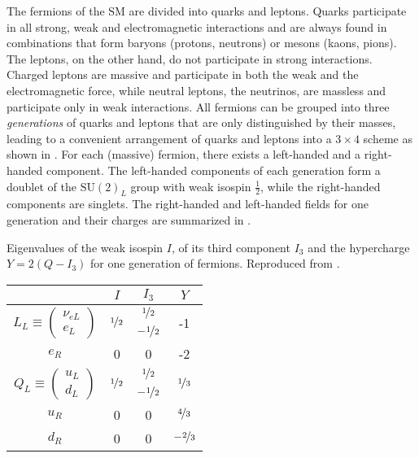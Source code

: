 The fermions of the SM are divided into quarks and leptons. Quarks participate in all strong, weak and electromagnetic interactions and are always found in combinations that form baryons (protons, neutrons) or mesons (kaons, pions). The leptons, on the other hand, do not participate in strong interactions. Charged leptons are massive and participate in both the weak and the electromagnetic force, while neutral leptons, the neutrinos, are massless and participate only in weak interactions. All fermions can be grouped into three \emph{generations} of quarks and leptons that are only distinguished by their masses, leading to a convenient arrangement of quarks and leptons into a $3\times4$ scheme as shown in . For each (massive) fermion, there exists a left-handed and a right-handed component. The left-handed components of each generation form a doublet of the $\mathrm{SU}(2)_L$ group with weak isospin $\frac{1}{2}$, while the right-handed components are singlets. The right-handed and left-handed fields for one generation and their charges are summarized in .
\begin{margintable}
    \caption{Eigenvalues of the weak isospin $I$, of its third component $I_3$ and the hypercharge $Y = 2(Q - I_3)$ for one generation of fermions. Reproduced from \cite{giunti-kim-neutrino}.}
    \label{tab:fermions-one-generation}
    \centering
    \begin{tabular}{cccc} \toprule
    & $I$ & $I_3$ & $Y$ \\ \midrule
    \multirow{2}{*}{$L_L \equiv \begin{pmatrix} \nu_{eL} \\ e_L \end{pmatrix}$} & \multirow{2}{*}{$\nicefrac{1}{2}$} & $\nicefrac{1}{2}$ & \multirow{2}{*}{-1}\\
    & & $-\nicefrac{1}{2}$ & \\ \midrule
    $e_R$ & 0 & 0 & -2 \\ \midrule
    \multirow{2}{*}{$Q_L \equiv \begin{pmatrix} u_L \\ d_L \end{pmatrix}$} & \multirow{2}{*}{$\nicefrac{1}{2}$} & $\nicefrac{1}{2}$ & \multirow{2}{*}{$\nicefrac{1}{3}$}\\
    & & $-\nicefrac{1}{2}$ & \\ \midrule
    $u_R$ & 0 & 0 & $\nicefrac{4}{3}$ \\
    $d_R$ & 0 & 0 & $-\nicefrac{2}{3}$ \\\bottomrule
    \end{tabular}
\end{margintable}

